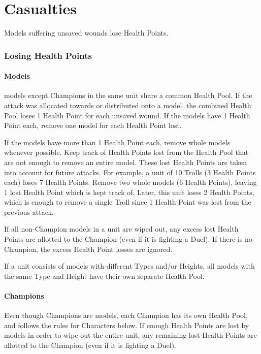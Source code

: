 
\part{Casualties}
\label{casualties}

Models suffering unsaved wounds lose Health Points.

\section{Losing Health Points}
\label{losing_health_points}

\subsection{\rnf{} Models}

\rnf{} models except Champions in the same unit share a common Health Pool. If the attack was allocated towards or distributed onto a \rnf{} model, the combined \rnf{} Health Pool loses 1 Health Point for each unsaved wound. If the \rnf{} models have 1 Health Point each, remove one \rnf{} model for each Health Point lost.

If the \rnf{} models have more than 1 Health Point each, remove whole \rnf{} models whenever possible. Keep track of Health Points lost from the Health Pool that are not enough to remove an entire model. These lost Health Points are taken into account for future attacks. For example, a unit of 10 Trolls (3 Health Points each) loses 7 Health Points. Remove two whole models (6 Health Points), leaving 1 lost Health Point which is kept track of. Later, this unit loses 2 Health Points, which is enough to remove a single Troll since 1 Health Point was lost from the previous attack.

If all non-Champion \rnf{} models in a unit are wiped out, any excess lost Health Points are allotted to the Champion (even if it is fighting a Duel). If there is no Champion, the excess Health Point losses are ignored.

If a unit consists of \rnf{} models with different Types and/or Heights, all \rnf{} models with the same Type and Height have their own separate Health Pool.

\subsection{Champions}

Even though Champions are \rnf{} models, each Champion has its own Health Pool, and follows the rules for Characters below. If enough Health Points are lost by \rnf{} models in order to wipe out the entire unit, any remaining lost Health Points are allotted to the Champion (even if it is fighting a Duel).

